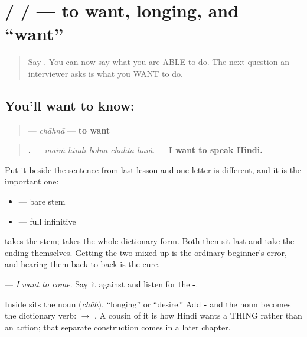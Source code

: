 \section[\texorpdfstring{\hi{चाहना} / \hi{चाह} … (chāhnā / chāh …)}{चाहना / चाह … (chāhnā / chāh …)}]{ /  /  — to want, longing, and \textquotedblleft{}want\textquotedblright{}}

\label{lesson:HI-C70-chahna}



\begin{quote}
Say \textbf{    }. You can now say what you are ABLE to do. The next question an interviewer asks is what you WANT to do.
\end{quote}

\subsection*{You'll want to know: }
\begin{quote}
\textbf{} — \emph{chāhnā} — \textbf{to want}
\end{quote}

\begin{quote}
\textbf{    .} — \emph{maiṁ hindī bolnā chāhtā hūṁ.} — \textbf{I want to speak Hindi.}
\end{quote}

Put it beside the sentence from last lesson and one letter is different, and it is the important one:

\begin{itemize}
\raggedright
  \item \textbf{    } — bare stem \textbf{}
  \item \textbf{    } — full infinitive \textbf{}
\end{itemize}

\textbf{} takes the stem; \textbf{} takes the whole dictionary form. Both then sit last and take the ending themselves. Getting the two mixed up is the ordinary beginner's error, and hearing them back to back is the cure.

\textbf{   } — \emph{I want to come}. Say it against \textbf{   } and listen for the \textbf{-}.

Inside \textbf{} sits the noun \textbf{} (\emph{chāh}), \textquotedblleft{}longing\textquotedblright{} or \textquotedblleft{}desire.\textquotedblright{} Add \textbf{-} and the noun becomes the dictionary verb: \textbf{ $\to$ }. A cousin of it is how Hindi wants a THING rather than an action; that separate construction comes in a later chapter.

